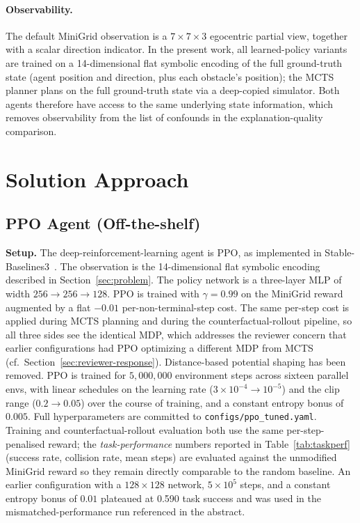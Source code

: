 \documentclass[conference]{IEEEtran}
\begin{document}
\paragraph{Observability.} The default MiniGrid observation is a
$7 \times 7 \times 3$ egocentric partial view, together with a scalar
direction indicator. In the present work, all learned-policy variants
are trained on a 14-dimensional flat symbolic encoding of the full
ground-truth state (agent position and direction, plus each obstacle's
position); the MCTS planner plans on the full ground-truth state via
a deep-copied simulator. Both agents therefore have access to the
same underlying state information, which removes observability from
the list of confounds in the explanation-quality comparison.

\section{Solution Approach}
\label{sec:approach}

\subsection{PPO Agent (Off-the-shelf)}
\textbf{Setup.} The deep-reinforcement-learning agent is PPO, as
implemented in Stable-Baselines3~\cite{sb3}. The observation is the
14-dimensional flat symbolic encoding described in
Section~\ref{sec:problem}. The policy network is a three-layer MLP of
width $256 \to 256 \to 128$. PPO is trained with $\gamma = 0.99$ on the MiniGrid reward augmented
by a flat $-0.01$ per-non-terminal-step cost. The same per-step cost
is applied during MCTS planning and during the counterfactual-rollout
pipeline, so all three sides see the identical MDP, which addresses
the reviewer concern that earlier configurations had PPO optimizing
a different MDP from MCTS (cf.~Section~\ref{sec:reviewer-response}).
Distance-based potential shaping has been removed. PPO is trained for
$5{,}000{,}000$ environment steps across sixteen parallel envs, with
linear schedules on the learning rate
($3\!\times\!10^{-4}\!\to\!10^{-5}$) and the clip range
($0.2\!\to\!0.05$) over the course of training, and a constant
entropy bonus of $0.005$. Full hyperparameters are committed to
\texttt{configs/ppo\_tuned.yaml}. Training and counterfactual-rollout
evaluation both use the same per-step-penalised reward; the
\emph{task-performance} numbers reported in
Table~\ref{tab:taskperf} (success rate, collision rate, mean steps)
are evaluated against the unmodified MiniGrid reward so they remain
directly comparable to the random baseline. An earlier
configuration with a $128\!\times\!128$ network, $5\!\times\!10^{5}$
steps, and a constant entropy bonus of $0.01$ plateaued at 0.590 task
success and was used in the mismatched-performance run referenced in
the abstract.
\end{document}
